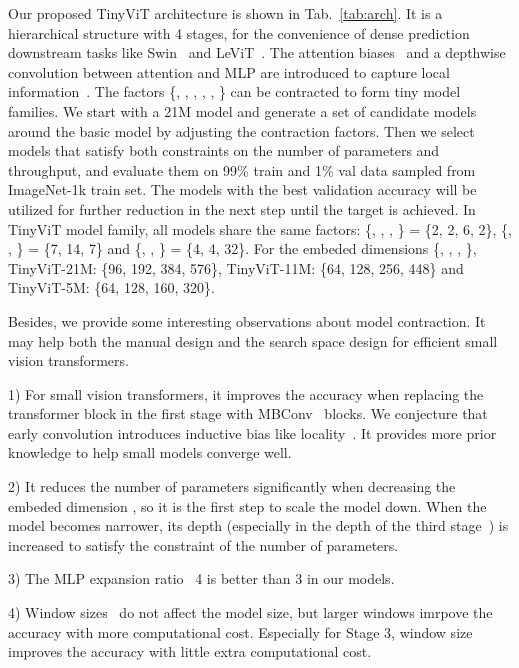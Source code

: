 \documentclass[runningheads]{llncs}
\newcommand{\IBratio}{}
\newcommand{\IBdepth}{}
\newcommand{\Tdima}{}
\newcommand{\Tdimb}{}
\newcommand{\Tdimc}{}
\newcommand{\Tdimd}{}
\newcommand{\TdimALL}{}
\newcommand{\Tdimh}{}
\newcommand{\mlp}{}
\newcommand{\dtwo}{}
\newcommand{\dthree}{}
\newcommand{\dfour}{}
\newcommand{\dALL}{}
\newcommand{\wstwo}{}
\newcommand{\wsthree}{}
\newcommand{\wsfour}{}
\newcommand{\wsALL}{}
\begin{document}
Our proposed TinyViT architecture is shown in Tab.~\ref{tab:arch}. It is a hierarchical structure with 4 stages, for the convenience of dense prediction downstream tasks like Swin~\cite{swin} and LeViT~\cite{levit}. The attention biases~\cite{levit} and a  depthwise convolution between attention and MLP are introduced to capture local information~\cite{irpe,chu2021conditional}.
The factors \{\TdimALL, \dALL, \wsALL, \IBratio, \mlp, \Tdimh\} can be contracted to form tiny model families.
We start with a 21M model and generate a set of candidate models around the basic model by adjusting the contraction factors. Then we select models that satisfy both constraints on the number of parameters and throughput, and evaluate them on 99\% train and 1\% val data sampled from ImageNet-1k train set. The models with the best validation accuracy will be utilized for further reduction in the next step until the target is achieved. In TinyViT model family, all models share the same factors: \{\IBdepth, \dtwo, \dthree, \dfour\} = \{2, 2, 6, 2\}, \{\wstwo, \wsthree, \wsfour\} = \{7, 14, 7\} and \{\IBratio, \mlp, \Tdimh\} = \{4, 4, 32\}. For the embeded dimensions \{\Tdima, \Tdimb, \Tdimc, \Tdimd\}, TinyViT-21M: \{96, 192, 384, 576\}, TinyViT-11M: \{64, 128, 256, 448\} and TinyViT-5M: \{64, 128, 160, 320\}.

Besides, we provide some interesting observations about model contraction. It may help both the manual design and the search space design for efficient small vision transformers.


1) For small vision transformers, it improves the accuracy when replacing the transformer block in the first stage with MBConv~\cite{mobilenetv3} blocks. We conjecture that early convolution introduces inductive bias like locality~\cite{early_conv,levit}. It provides more prior knowledge to help small models converge well.

2) It reduces the number of parameters significantly when decreasing the embeded dimension \TdimALL, so it is the first step to scale the model down. When the model becomes narrower, its depth (especially in the depth of the third stage~\dthree) is increased to satisfy the constraint of the number of parameters.

3) The MLP expansion ratio \mlp~4 is better than 3 in our models. 

4) Window sizes \wsALL~do not affect the model size, but larger windows imrpove the accuracy with more computational cost. Especially for Stage 3,  window size improves the accuracy with little extra computational cost.
\end{document}

